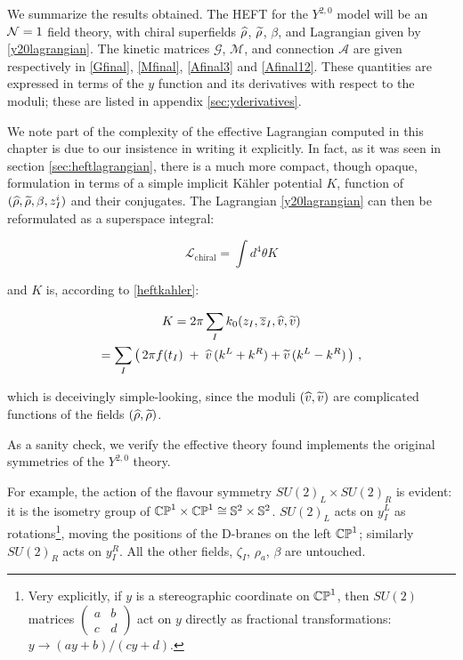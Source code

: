 We summarize the results obtained. The HEFT for the $Y^{2,0}$ model will be an $\mathcal{N} = 1$ field theory, with chiral superfields $\widehat{\rho}$, $\widetilde{\rho}$, $\beta$, and Lagrangian given by \eqref{y20lagrangian}. The kinetic matrices $\mathcal{G}$, $\mathcal{M}$, and connection $\mathcal{A}$ are given respectively in \eqref{Gfinal}, \eqref{Mfinal}, \eqref{Afinal3} and \eqref{Afinal12}. These quantities are expressed in terms of the $y$ function and its derivatives with respect to the moduli; these are listed in appendix \ref{sec:yderivatives}.

We note part of the complexity of the effective Lagrangian computed in this chapter is due to our insistence in writing it explicitly. In fact, as it was seen in section \ref{sec:heftlagrangian}, there is a much more compact, though opaque, formulation in terms of a simple implicit K\"ahler potential $K$, function of $(\widehat{\rho},\widetilde{\rho},\beta,z_I^i)$ and their conjugates. The Lagrangian \eqref{y20lagrangian} can then be reformulated as a superspace integral:

\begin{equation}
	\mathcal{L}_\mathrm{chiral} = \int d^4 \theta K
	\label{}
\end{equation}

and $K$ is, according to \eqref{heftkahler}:

\begin{gather}
	K = 2\pi \sum_I k_0(z_I, \overline{z}_I,\widehat{v}, \widetilde{v}) \\
	= \sum_I \left(\, 2\pi f(t_I) \;+\; \widehat{v}\, (k^L + k^R) + \widetilde{v}\,(k^L - k^R)\, \right)\,,
	\label{effectivekahler}
\end{gather}

which is deceivingly simple-looking, since the moduli $(\widehat{v},\widetilde{v})$ are complicated functions of the fields $(\widehat{\rho},\widetilde{\rho})$.

As a sanity check, we verify the effective theory found implements the original symmetries of the $Y^{2,0}$ theory. 

For example, the action of the flavour symmetry $SU(2)_L \times SU(2)_R$ is evident: it is the isometry group of $\mathbb{CP}^1 \times \mathbb{CP}^1 \cong \mathbb{S}^2 \times \mathbb{S}^2$. $SU(2)_L$ acts on $y^L_I$ as rotations\footnote{Very explicitly, if $y$ is a stereographic coordinate on $\mathbb{CP}^1$, then $SU(2)$ matrices $\begin{pmatrix}a & b\\ c & d\end{pmatrix}$ act on $y$ directly as fractional transformations: $y \rightarrow (ay+b)/(cy+d)$.}, moving the positions of the D-branes on the left $\mathbb{CP}^1$; similarly $SU(2)_R$ acts on $y^R_I$. All the other fields, $\zeta_I$, $\rho_a$, $\beta$ are untouched.

